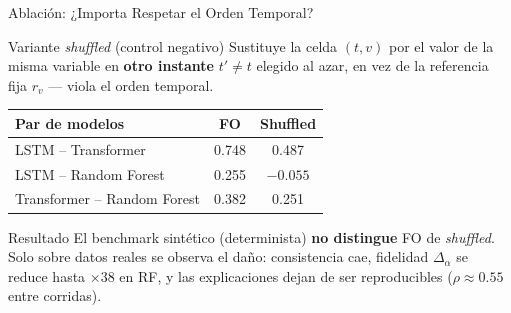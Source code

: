 \documentclass{beamer}
\begin{document}
\begin{frame}{Ablación: ¿Importa Respetar el Orden Temporal?}
    \begin{block}{Variante \emph{shuffled} (control negativo)}
        Sustituye la celda $(t,v)$ por el valor de la misma variable
        en \textbf{otro instante} $t'\neq t$ elegido al azar, en vez
        de la referencia fija $r_v$ — viola el orden temporal.
    \end{block}
    \centering
    \scriptsize
    \begin{tabular}{lcc}
        \toprule
        \textbf{Par de modelos} & \textbf{FO} & \textbf{Shuffled} \\
        \midrule
        LSTM -- Transformer          & 0.748 & 0.487 \\
        LSTM -- Random Forest        & 0.255 & $-0.055$ \\
        Transformer -- Random Forest & 0.382 & 0.251 \\
        \bottomrule
    \end{tabular}
    \vspace{0.2cm}
    \begin{alertblock}{Resultado}
        El benchmark sintético (determinista) \textbf{no distingue}
        FO de \emph{shuffled}. Solo sobre datos reales se observa el
        daño: consistencia cae, fidelidad $\Delta_\alpha$ se reduce
        hasta ${\times}38$ en RF, y las explicaciones dejan de ser
        reproducibles ($\rho\approx0.55$ entre corridas).
    \end{alertblock}
\end{frame}
\end{document}
